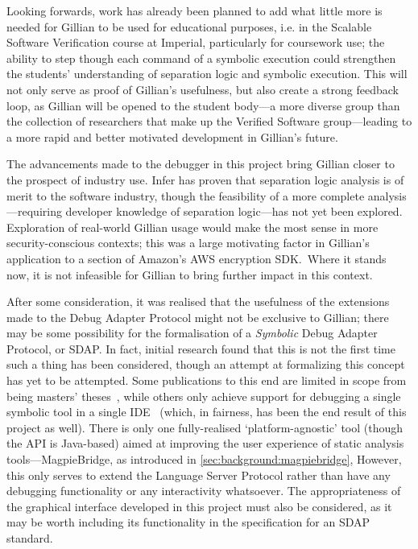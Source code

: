 Looking forwards, work has already been planned to add what little more is
needed for Gillian to be used for educational purposes, i.e. in the Scalable Software Verification course at Imperial, particularly for coursework use; the ability to step though each command of a symbolic execution could strengthen the students'
understanding of separation logic and symbolic execution. This will not only serve as proof of
Gillian's usefulness, but also create a strong feedback loop, as Gillian
will be opened to the student body---a more diverse group than the
collection of researchers that make up the Verified Software group---leading
to a more rapid and better motivated development in Gillian's future.

The advancements made to the debugger in this project bring Gillian closer
to the prospect of industry use. Infer has proven that separation logic analysis
is of merit to the software industry, though the feasibility of a more complete
analysis---requiring developer knowledge of separation logic---has not yet
been explored. Exploration of real-world Gillian usage would make the most sense
in more security-conscious contexts; this was a large motivating factor in
Gillian's application to a section of Amazon's AWS encryption SDK.\ Where it
stands now, it is not infeasible for Gillian to bring further impact in this context. %

After some consideration, it was realised that the usefulness of the extensions
made to the Debug Adapter Protocol might not be exclusive to Gillian; there may
be some possibility for the formalisation of a \textit{Symbolic} Debug Adapter
Protocol, or SDAP. In fact, initial research found that this is not the first
time such a thing has been considered, though an attempt at formalizing this
concept has yet to be attempted. Some publications to this end are limited in
scope from being masters' theses~\cite{sdap-arxiv, sdap-aurecchia},  while others
only achieve support for debugging a single symbolic tool in a single
IDE~\cite{sdap-colombo, sdap-kps}  (which, in fairness, has been the end result
of this project as well).
There is only one fully-realised `platform-agnostic' tool (though the API is
Java-based) aimed at improving the user experience of static analysis tools---MagpieBridge, as introduced in \autoref{sec:background:magpiebridge},
However, this only serves to extend the Language Server Protocol rather than
have any debugging functionality or any interactivity whatsoever.
The appropriateness of the graphical interface developed in this project must
also be considered, as it may be worth including its functionality in the
specification for an SDAP standard.
